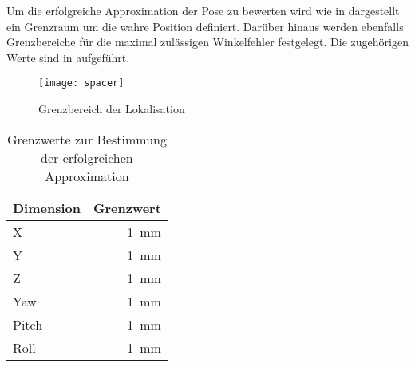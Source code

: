 
Um die erfolgreiche Approximation der Pose zu bewerten wird wie in  dargestellt ein Grenzraum um die wahre Position definiert. Darüber hinaus werden ebenfalls Grenzbereiche für die maximal zulässigen Winkelfehler festgelegt. Die zugehörigen Werte sind in  aufgeführt.\\

\begin{figure}[!ht]
	\begin{center}
		\texttt{[image: spacer]}
		\caption{Grenzbereich der Lokalisation}
		\label{fig.loclimits}
	\end{center}
\end{figure}

\begin{table}[ht]
	\centering
	\caption{Grenzwerte zur Bestimmung der erfolgreichen Approximation}\label{tab.TechSpecYouBotBase}
	\vspace*{-3mm}
	\begin{tabular}[ht]{|l|r|}\hline
		\rowcolor{Snow2}
		Dimension		& Grenzwert 					\\ \hline
		X				& \SI{1}{\milli\meter}		\\ \hline		
		Y				& \SI{1}{\milli\meter}		\\ \hline
		Z				& \SI{1}{\milli\meter}		\\ \hline
		Yaw				& \SI{1}{\milli\meter}		\\ \hline
		Pitch			& \SI{1}{\milli\meter}		\\ \hline
		Roll 			& \SI{1}{\milli\meter}		\\ \hline		
		\hline
	\end{tabular} 
	\vspace*{-3mm}
\end{table}

